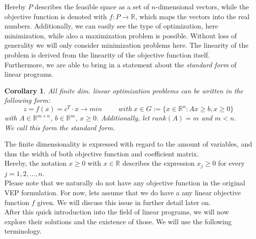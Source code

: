 \documentclass[a4paper, 11pt]{article}
\newtheorem{corollary}{Corollary}
\begin{document}
Hereby $P$ describes the feasible space as a set of $n$-dimensional vectors, while the objective function is denoted with $f:P\rightarrow\mathbb{R}$, which maps the vectors into the real numbers. Additionally, we can easily see the type of optimization, here minimization, while also a maximization problem is possible. Without loss of generality we will only consider minimization problems here. The linearity of the problem is derived from the linearity of the objective function itself. \\

Furthermore, we are able to bring in a statement about the \textit{standard form} of linear programs. \\
\begin{corollary}
	All finite dim. linear optimization problems can be written in the following form:\\
	\begin{equation}
		\label{standardform}
		z = f(x) = c^T \cdot x \rightarrow min \hspace{1cm} with\ x \in G:=\{x \in \mathbb{R}^n: Ax \geq b, x \geq 0\}
	\end{equation}
	with $A\in \mathbb{R}^{m\times n}$, $b\in\mathbb{R}^m$, $x\geq 0$. Additionally, let $rank(A)=m$ and $m< n$.\\
	We call this form the \textit{standard form}.
\end{corollary}
The finite dimensionality is expressed with regard to the amount of variables, and thus the width of both objective function and coefficient matrix. \\

Hereby, the notation $x\geq0$ with $x\in \mathbb{R}$ describes the expression $x_j\geq 0$ for every $j=1,2,\dots,n$.\\ 
Please note that we naturally do not have any objective function in the original VEP formulation. For now, lets assume that we do have a any linear objective function $f$ given. We will discuss this issue in further detail later on.\\
After this quick introduction into the field of linear programs, we will now explore their solutions and the existence of those. We will use the following terminology.
\end{document}
